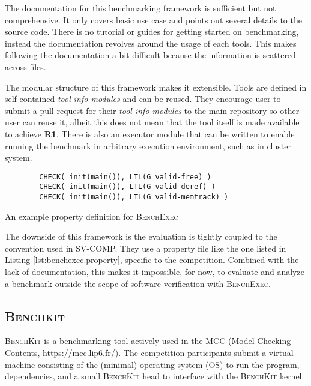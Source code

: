 The documentation for this benchmarking framework is sufficient but not comprehensive.
It only covers basic use case and points out several details to the source code.
There is no tutorial or guides for getting started on benchmarking, instead the documentation revolves around the usage of each tools.
This makes following the documentation a bit difficult because the information is scattered across files.

The modular structure of this framework makes it extensible.
Tools are defined in self-contained \textit{tool-info modules} and can be reused.
They encourage user to submit a pull request for their \textit{tool-info modules} to the main repository so other user can reuse it, albeit this does not mean that the tool itself is made available to achieve \textbf{R1}.
There is also an executor module that can be written to enable running the benchmark in arbitrary execution environment, such as in cluster system.

\begin{listing}
    \begin{verbatim}
        CHECK( init(main()), LTL(G valid-free) )
        CHECK( init(main()), LTL(G valid-deref) )
        CHECK( init(main()), LTL(G valid-memtrack) )
    \end{verbatim}
    \caption{An example property definition for \textsc{BenchExec}}
    \label{lst:benchexec.property}
\end{listing}

The downside of this framework is the evaluation is tightly coupled to the convention used in SV-COMP.
They use a property file like the one listed in Listing \ref{lst:benchexec.property}, specific to the competition.
Combined with the lack of documentation, this makes it impossible, for now, to evaluate and analyze a benchmark outside the scope of software verification with \textsc{BenchExec}.


\subsection{\textsc{Benchkit}}

\textsc{BenchKit} \citep{benchkit:2013} is a benchmarking tool actively used in the MCC (Model Checking Contents, \url{https://mcc.lip6.fr/}).
The competition participants submit a virtual machine consisting of the (minimal) operating system (OS) to run the program, dependencies, and a small \textsc{BenchKit} head to interface with the \textsc{BenchKit} kernel.

